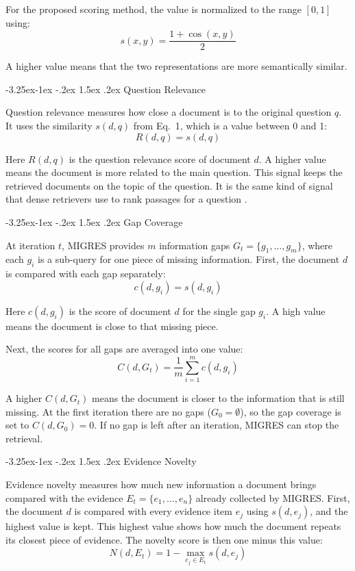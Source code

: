\documentclass[12pt,a4paper]{report}
\makeatletter
\renewcommand\subsection{\@startsection{subsection}{2}{\z@}%
    {-3.25ex\@plus -1ex \@minus -.2ex}%
    {1.5ex \@plus .2ex}%
    {\normalfont\fontsize{14}{17}\selectfont\bfseries}}
\makeatother
\begin{document}
For the proposed scoring method, the value is normalized to the range $[0,1]$ using:
\[
\boxed{
 s(x,y)=\frac{1+\operatorname{cos}(x,y)}{2}
}
\tag{1}
\]

A higher value means that the two representations are more semantically similar.

\subsection{Question Relevance}

Question relevance measures how close a document is to the original question $q$. It uses the similarity $s(d,q)$ from Eq.~1, which is a value between 0 and 1:
\[
\boxed{R(d,q)=s(d,q)}
\tag{2}
\]

Here $R(d,q)$ is the question relevance score of document $d$. A higher value means the document is more related to the main question. This signal keeps the retrieved documents on the topic of the question. It is the same kind of signal that dense retrievers use to rank passages for a question \cite{karpukhin2020dpr}.

\subsection{Gap Coverage}

At iteration $t$, MIGRES provides $m$ information gaps $G_t=\{g_1,\dots,g_m\}$, where each $g_i$ is a sub-query for one piece of missing information. First, the document $d$ is compared with each gap separately:
\[
\boxed{c(d,g_i)=s(d,g_i)}
\tag{3}
\]

Here $c(d,g_i)$ is the score of document $d$ for the single gap $g_i$. A high value means the document is close to that missing piece.

Next, the scores for all gaps are averaged into one value:
\[
\boxed{
C(d,G_t)=\frac{1}{m}\sum_{i=1}^{m}c(d,g_i)
}
\tag{4}
\]

A higher $C(d,G_t)$ means the document is closer to the information that is still missing. At the first iteration there are no gaps ($G_0=\emptyset$), so the gap coverage is set to $C(d,G_0)=0$. If no gap is left after an iteration, MIGRES can stop the retrieval.

\subsection{Evidence Novelty}

Evidence novelty measures how much new information a document brings compared with the evidence $E_t=\{e_1,\dots,e_n\}$ already collected by MIGRES. First, the document $d$ is compared with every evidence item $e_j$ using $s(d,e_j)$, and the highest value is kept. This highest value shows how much the document repeats its closest piece of evidence. The novelty score is then one minus this value:
\[
\boxed{
N(d,E_t)=1-\max_{e_j\in E_t}s(d,e_j)
}
\tag{5}
\]
\end{document}
